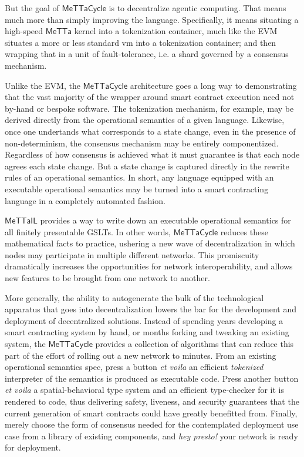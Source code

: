 \documentclass{article}
\newcommand{\MC}{\mathsf{MeTTaCycle}}
\begin{document}
But the goal of $\MC$ is to decentralize agentic computing. That means
much more than simply improving the language. Specifically, it means
situating a high-speed $\mathsf{MeTTa}$ kernel into a tokenization
container, much like the EVM situates a more or less standard vm into
a tokenization container; and then wrapping that in a unit of
fault-tolerance, i.e. a shard governed by a consensus mechanism.

Unlike the EVM, the $\MC$ architecture goes a long way to
demonstrating that the vast majority of the wrapper around smart
contract execution need not by-hand or bespoke software. The
tokenization mechanism, for example, may be derived directly from the
operational semantics of a given language. Likewise, once one
undertands what corresponds to a state change, even in the presence of
non-determinism, the consensus mechanism may be entirely
componentized. Regardless of how consensus is achieved what it must
guarantee is that each node agrees each state change. But a state
change is captured directly in the rewrite rules of an operational
semantics. In short, any language equipped with an executable
operational semantics may be turned into a smart contracting language
in a completely automated fashion.

$\mathsf{MeTTaIL}$ provides a way to write down an executable
operational semantics for all finitely presentable GSLTs. In other
words, $\MC$ reduces these mathematical facts to practice, ushering a
new wave of decentralization in which nodes may participate in
multiple different networks. This promiscuity dramatically increases
the opportunities for network interoperability, and allows new
features to be brought from one network to another.

More generally, the ability to autogenerate the bulk of the
technological apparatus that goes into decentralization lowers the bar
for the development and deployment of decentralized solutions. Instead
of spending years developing a smart contracting system by hand, or
months forking and tweaking an existing system, the $\MC$ provides a
collection of algorithms that can reduce this part of the effort of
rolling out a new network to minutes. From an existing operational
semantics spec, press a button \emph{et voila} an efficient
\emph{tokenized} interpreter of the semantics is produced as
executable code. Press another button \emph{et voila} a
spatial-behavioral type system and an efficient type-checker for it is
rendered to code, thus delivering safety, liveness, and security
guarantees that the current generation of smart contracts could have
greatly benefitted from. Finally, merely choose the form of consensus
needed for the contemplated deployment use case from a library of
existing components, and \emph{hey presto!} your network is ready for
deployment.
\end{document}
